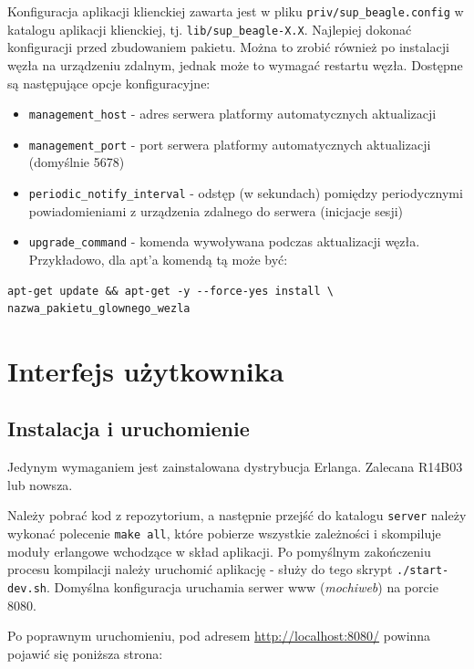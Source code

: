 \documentclass[polish,12pt]{aghthesis}
\begin{document}
Konfiguracja aplikacji klienckiej zawarta jest w pliku \texttt{priv/sup\_beagle.config} w katalogu aplikacji klienckiej, tj. \texttt{lib/sup\_beagle-X.X}. Najlepiej dokonać konfiguracji przed zbudowaniem pakietu. Można to zrobić również po instalacji węzła na urządzeniu zdalnym, jednak może to wymagać restartu węzła. Dostępne są następujące opcje konfiguracyjne:
\begin{itemize}
\item \texttt{management\_host} - adres serwera platformy automatycznych aktualizacji
\item \texttt{management\_port} - port serwera platformy automatycznych aktualizacji (domyślnie 5678)
\item \texttt{periodic\_notify\_interval} - odstęp (w sekundach) pomiędzy periodycznymi powiadomieniami z urządzenia zdalnego do serwera (inicjacje sesji)
\item \texttt{upgrade\_command} - komenda wywoływana podczas aktualizacji węzła. Przykładowo, dla apt'a komendą tą może być:
\end{itemize}

\begin{lstlisting}
apt-get update && apt-get -y --force-yes install \
nazwa_pakietu_glownego_wezla
\end{lstlisting}

\section{Interfejs użytkownika}
\subsection{Instalacja i uruchomienie}

Jedynym wymaganiem jest zainstalowana dystrybucja Erlanga. Zalecana R14B03 lub nowsza.

Należy pobrać kod z repozytorium, a następnie przejść do katalogu \texttt{server} należy wykonać polecenie \texttt{make all}, które pobierze wszystkie zależności i skompiluje moduły erlangowe wchodzące w skład aplikacji. Po pomyślnym zakończeniu procesu kompilacji należy uruchomić aplikację - służy do tego skrypt \texttt{./start-dev.sh}. Domyślna konfiguracja uruchamia serwer www (\emph{mochiweb}) na porcie 8080.

Po poprawnym uruchomieniu, pod adresem \url{http://localhost:8080/} powinna pojawić się poniższa strona:

\centerline{
}
\end{document}
